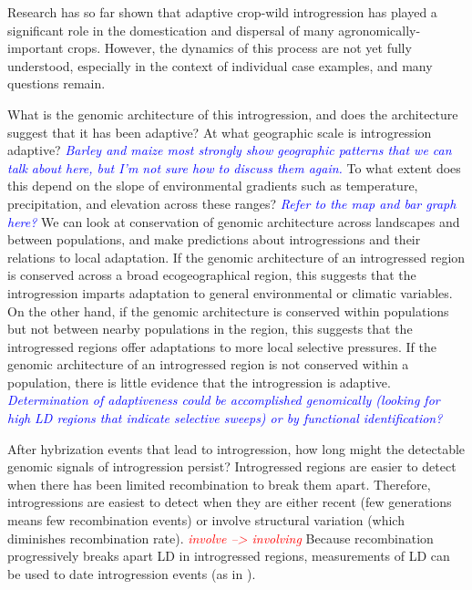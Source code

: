 \documentclass[11pt]{article}
\newcommand{\lwang}[1]{\textcolor{red}{ \emph{\scriptsize  #1}} } %
\newcommand{\gmj}[1]{\textcolor{blue}{ \emph{\scriptsize  #1}} } %
\begin{document}
Research has so far shown that adaptive crop-wild introgression has played a significant role in the domestication and dispersal of many agronomically-important crops.
However, the dynamics of this process are not yet fully understood, especially in the context of individual case examples, and many questions remain.


What is the genomic architecture of this introgression, and does the architecture suggest that it has been adaptive?
At what geographic scale is introgression adaptive?
\gmj{Barley and maize most strongly show geographic patterns that we can talk about here, but I'm not sure how to discuss them again.}
To what extent does this depend on the slope of environmental gradients such as temperature, precipitation, and elevation across these ranges?
\gmj{Refer to the map and bar graph here?}
We can look at conservation of genomic architecture across landscapes and between populations, and make predictions about introgressions and their relations to local adaptation.
If the genomic architecture of an introgressed region is conserved across a broad ecogeographical region, this suggests that the introgression imparts adaptation to general environmental or climatic variables.
On the other hand, if the genomic architecture is conserved within populations but not between nearby populations in the region, this suggests that the introgressed regions offer adaptations to more local selective pressures.
If the genomic architecture of an introgressed region is not conserved within a population, there is little evidence that the introgression is adaptive.
\gmj{Determination of adaptiveness could be accomplished genomically (looking for high LD regions that indicate selective sweeps) or by functional identification?}


After hybrization events that lead to introgression, how long might the detectable genomic signals of introgression persist?
Introgressed regions are easier to detect when there has been limited recombination to break them apart.
Therefore, introgressions are easiest to detect when they are either recent (few generations means few recombination events) or involve structural variation (which diminishes recombination rate).
\lwang{involve --> involving}
Because recombination progressively breaks apart LD in introgressed regions, measurements of LD can be used to date introgression events (as in \cite{Poets2015}).
\end{document}
